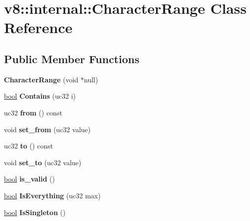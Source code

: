\hypertarget{classv8_1_1internal_1_1CharacterRange}{}\section{v8\+:\+:internal\+:\+:Character\+Range Class Reference}
\label{classv8_1_1internal_1_1CharacterRange}
\subsection*{Public Member Functions}
\begin{DoxyCompactItemize}
\item 
\mbox{\label{classv8_1_1internal_1_1CharacterRange_a1c257176d47561b468f2d9fcba3768ee}} 
{\bfseries Character\+Range} (void $\ast$null)
\item 
\mbox{\label{classv8_1_1internal_1_1CharacterRange_a84c0fb224399883bcb7dd49c7d931300}} 
\mbox{\hyperlink{classbool}{bool}} {\bfseries Contains} (uc32 i)
\item 
\mbox{\label{classv8_1_1internal_1_1CharacterRange_a0d5074f9a67ed18805afac793d98efde}} 
uc32 {\bfseries from} () const
\item 
\mbox{\label{classv8_1_1internal_1_1CharacterRange_a043b323901eedeac660aeca2584c74e6}} 
void {\bfseries set\+\_\+from} (uc32 value)
\item 
\mbox{\label{classv8_1_1internal_1_1CharacterRange_adb1a90ad72f795a40d620142f55a9bd2}} 
uc32 {\bfseries to} () const
\item 
\mbox{\label{classv8_1_1internal_1_1CharacterRange_a730aeee22db49c1f0077fa09fc450564}} 
void {\bfseries set\+\_\+to} (uc32 value)
\item 
\mbox{\label{classv8_1_1internal_1_1CharacterRange_a291c287ee7cb98c102dc433db3aac1e6}} 
\mbox{\hyperlink{classbool}{bool}} {\bfseries is\+\_\+valid} ()
\item 
\mbox{\label{classv8_1_1internal_1_1CharacterRange_a2cfef11be8ffac4371e3b9b87fb9bbd6}} 
\mbox{\hyperlink{classbool}{bool}} {\bfseries Is\+Everything} (uc32 max)
\item 
\mbox{\label{classv8_1_1internal_1_1CharacterRange_aef36eef7241d9380d60df9a8bbaf71ec}} 
\mbox{\hyperlink{classbool}{bool}} {\bfseries Is\+Singleton} ()
\end{DoxyCompactItemize}
